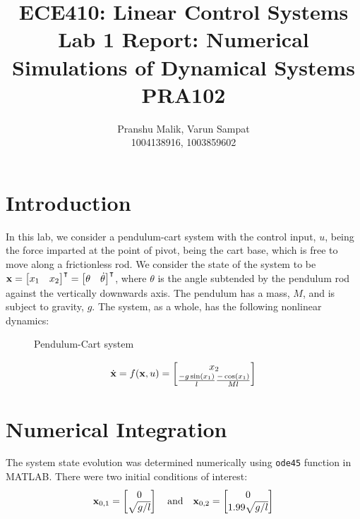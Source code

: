 \documentclass[10pt]{article}
\date{}
\begin{document}
\title{\textbf{\Large{\textsc{ECE410:} Linear Control Systems}} \\ \Large{Lab 1 Report: Numerical Simulations of Dynamical Systems} \\ \textbf{\small{PRA102}}\vspace{-0.3cm}}
\author{Pranshu Malik, Varun Sampat \\ \footnotesize{1004138916}, \footnotesize{1003859602}\vspace{-3cm}}

\maketitle

\section{Introduction}
In this lab, we consider a pendulum-cart system with the control input, $u$, being the force imparted at the point of pivot, being the cart base, which is free to move along a frictionless rod. We consider the state of the system to be $\mathbf{x} = \begin{bmatrix} x_1 & x_2 \end{bmatrix}^\intercal = \begin{bmatrix} \theta & \dot{\theta} \end{bmatrix}^\intercal$, where $\theta$ is the angle subtended by the pendulum rod against the vertically downwards axis. The pendulum has a mass, $M$, and is subject to gravity, $g$. The system, as a whole, has the following nonlinear dynamics:

\begin{figure}[!h]
\centering
\pendcartsimple
\caption{Pendulum-Cart system}
\end{figure}

\begin{equation*}
    \dot{\mathbf{x}} = f(\mathbf{x}, u) = \begin{bmatrix}  x_2 \\ \frac{-g \sin(x_1)}{l} \frac{-\cos(x_1)}{Ml} \end{bmatrix}
\end{equation*}

\section{Numerical Integration}
The system state evolution was determined numerically using \texttt{ode45} function in MATLAB. There were two initial conditions of interest:
\begin{equation*}
    \mathbf{x}_{0,1} = \begin{bmatrix}  0\\ \sqrt{g/l}  \end{bmatrix}\quad \text{and} \quad \mathbf{x}_{0,2} =  \begin{bmatrix} 0\\1.99 \sqrt{g/l} \end{bmatrix}
\end{equation*}
\end{document}
